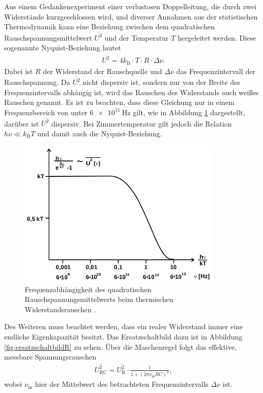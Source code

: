 Aus einem Gedankenexperiment einer verlustosen Doppelleitung, die durch zwei Widerstände
kurzgeschlossen wird, und diverser Annahmen aus der statistischen Thermodynamik kann eine
Beziehung zwischen dem quadratischen Rauschspannungsmittelwert $\overline{U^2}$ und der Temperatur
$T$ hergeleitet werden. Diese sogenannte Nyquist-Beziehung lautet
\begin{align}
  \overline{U^2} = 4 k_\text{B} \cdot T \cdot R \cdot \Delta \nu.
\end{align}
Dabei ist $R$ der Widerstand der Rauschquelle und $\Delta \nu$ das Frequenzintervall der Rauschspannung. Da
$\overline{U^2}$ nicht dispersiv ist, sondern nur von der Breite des Frequenzintervalls abhängig ist, wird das Rauschen des Widerstands auch weißes Rauschen genannt.
Es ist zu beachten, dass diese Gleichung nur in einem Frequenzbereich von unter $\SI{6e11}{\hertz}$ gilt,
wie in Abbildung \ref{fig:freqab} dargestellt, darüber ist $\overline{U^2}$ dispersiv. Bei Zimmertemperatur gilt jedoch die Relation
$h\nu \ll k_\text{B}T$ und damit auch die Nyquist-Beziehung.

\begin{figure}
  \centering
  \includegraphics[height=7cm]{Dickpics/freqab.png}
  \caption{Frequenzabhängigkeit des quadratischen Rauschspannungsmittelwerts beim thermischen Widerstandsrauschen \cite{anleitung}.}
  \label{fig:freqab}
\end{figure}

Des Weiteren muss beachtet werden, dass ein realer Widerstand immer eine endliche Eigenkapazität besitzt. Das Ersatzschaltbild
dazu ist in Abbildung \ref{fig:ersatzschaltbildR} zu sehen. Über die Maschenregel folgt das effektive, messbare Spannungsrauschen
\begin{align}
  \overline{U_{\text{RC}}^2} = \overline{U_{\text{R}}^2} \cdot \frac1{1+(2\pi\nu_\text{m} RC)^2},
\end{align}
wobei $\nu_\text{m}$ hier der Mittelwert des betrachteten Frequenzintervalls $\Delta \nu$ ist.

